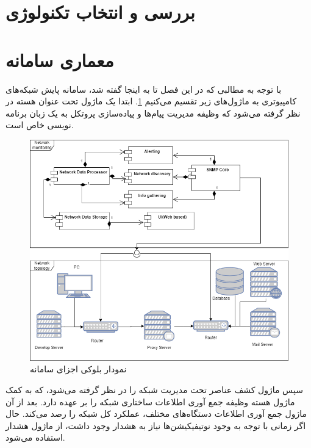 \section{بررسی و انتخاب تکنولوژی}





\newpage

\section{معماری سامانه}




با توجه به مطالبی که در این فصل تا به اینجا گفته شد، سامانه پایش شبکه‌های کامپیوتری به ماژول‌های زیر تقسیم می‌کنیم \cref{fig.11}. ابتدا یک ماژول تحت عنوان هسته  در نظر گرفته می‌شود که وظیفه مدیریت پیام‌ها و پیاده‌سازی پروتکل به یک زبان برنامه نویسی خاص است.




\begin{figure}[!h]
\centering\includegraphics[scale=.55]{./diagram}
\caption{نمودار بلوکی اجزای سامانه}\label{fig.11}
\end{figure}


سپس ماژول کشف عناصر تحت مدیریت شبکه را در نظر گرفته می‌شود، که به کمک ماژول هسته وظیفه جمع آوری اطلاعات ساختاری شبکه را بر عهده دارد. بعد از آن ماژول جمع آوری اطلاعات دستگاه‌های مختلف، عملکرد کل شبکه را رصد می‌کند. حال اگر زمانی با توجه به وجود نوتیفیکیشن‌ها نیاز به هشدار وجود داشت، از ماژول هشدار استفاده می‌شود. 


